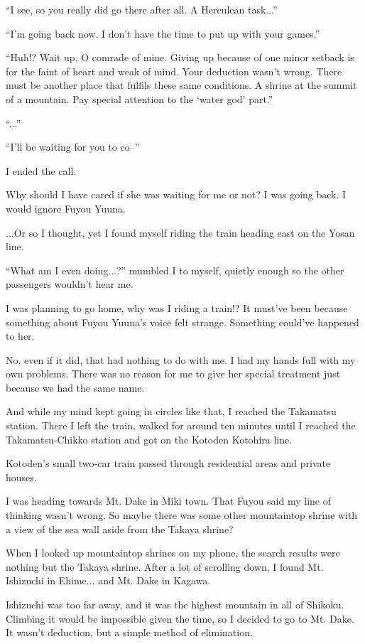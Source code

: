 ``I see, so you really did go there after all. A Herculean task...''

``I'm going back now. I don't have the time to put up with your games.''

``Huh!? Wait up, O comrade of mine. Giving up because of one minor setback is for the faint of heart and weak of mind. Your deduction wasn't wrong. There must be another place that fulfils these same conditions. A shrine at the summit of a mountain. Pay special attention to the `water god' part.''

``...''

``I'll be waiting for you to co--''

I ended the call.

Why should I have cared if she was waiting for me or not? I was going back. I would ignore Fuyou Yuuna.

...Or so I thought, yet I found myself riding the train heading east on the Yosan line.

``What am I even doing...?'' mumbled I to myself, quietly enough so the other passengers wouldn't hear me.

I was planning to go home, why was I riding a train!? It must've been because something about Fuyou Yuuna's voice felt strange. Something could've happened to her.

No, even if it did, that had nothing to do with me. I had my hands full with my own problems. There was no reason for me to give her special treatment just because we had the same name.

And while my mind kept going in circles like that, I reached the Takamatsu station. There I left the train, walked for around ten minutes until I reached the Takamatsu-Chikko station and got on the Kotoden Kotohira line.

Kotoden's small two-car train passed through residential areas and private houses.

I was heading towards Mt. Dake in Miki town. That Fuyou said my line of thinking wasn't wrong. So maybe there was some other mountaintop shrine with a view of the sea wall aside from the Takaya shrine?

When I looked up mountaintop shrines on my phone, the search results were nothing but the Takaya shrine. After a lot of scrolling down, I found Mt. Ishizuchi in Ehime... and Mt. Dake in Kagawa.

Ishizuchi was too far away, and it was the highest mountain in all of Shikoku. Climbing it would be impossible given the time, so I decided to go to Mt. Dake. It wasn't deduction, but a simple method of elimination.

